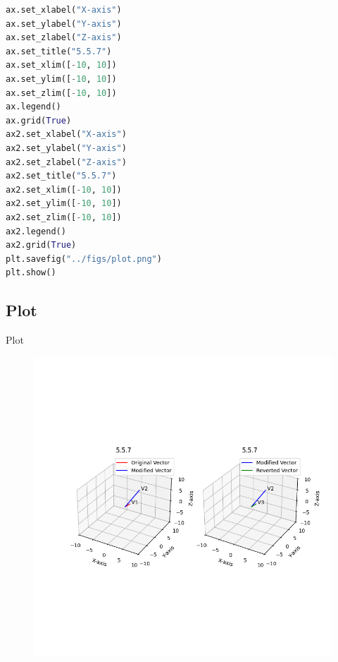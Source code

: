 \documentclass{beamer}
\theoremstyle{remark}
\numberwithin{equation}{section}
\begin{document}
\begin{frame}[fragile]
\begin{lstlisting}[language=Python]
ax.set_xlabel("X-axis")
ax.set_ylabel("Y-axis")
ax.set_zlabel("Z-axis")
ax.set_title("5.5.7")
ax.set_xlim([-10, 10])
ax.set_ylim([-10, 10])
ax.set_zlim([-10, 10])
ax.legend()
ax.grid(True)
ax2.set_xlabel("X-axis")
ax2.set_ylabel("Y-axis")
ax2.set_zlabel("Z-axis")
ax2.set_title("5.5.7")
ax2.set_xlim([-10, 10])
ax2.set_ylim([-10, 10])
ax2.set_zlim([-10, 10])
ax2.legend()
ax2.grid(True)
plt.savefig("../figs/plot.png")
plt.show()
\end{lstlisting}
\end{frame}

\subsection{Plot}
\begin{frame}{Plot}
 \begin{figure}[H]
    \centering
    \includegraphics[width=0.8\columnwidth]{../figs/plot.png}
    \caption*{}
    \label{fig:plot}
\end{figure}
\end{frame}
\end{document}
